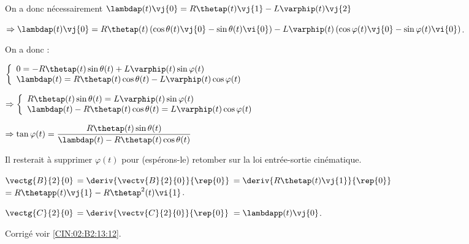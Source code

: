 On a donc nécessairement 
$\lambdap(t) \vj{0}= R\thetap(t) \vj{1} - L\varphip(t)\vj{2}$

$\Rightarrow \lambdap(t) \vj{0}= R\thetap(t) \left( \cos\theta(t)\vj{0}-\sin\theta(t)\vi{0} \right) - L\varphip(t)\left( \cos\varphi(t)\vj{0}-\sin\varphi(t)\vi{0}\right)$.

On a donc :

$
\left\{
\begin{array}{l}
0= -R\thetap(t) \sin\theta(t)  + L\varphip(t)\sin\varphi(t) \\
\lambdap(t) = R\thetap(t)  \cos\theta(t)- L\varphip(t)\cos\varphi(t)
\end{array}
\right.
$

$
\Rightarrow \left\{
\begin{array}{l}
R\thetap(t) \sin\theta(t)  = L\varphip(t)\sin\varphi(t) \\
\lambdap(t) - R\thetap(t)  \cos\theta(t)= L\varphip(t)\cos\varphi(t)
\end{array}
\right.
$

$\Rightarrow 
\tan \varphi(t) = \dfrac{R\thetap(t) \sin\theta(t) }{\lambdap(t) - R\thetap(t)  \cos\theta(t)}
$

Il resterait à supprimer $\varphi(t)$ pour (espérons-le) retomber sur la loi entrée-sortie cinématique.

\else
\fi


\ifprof
$\vectg{B}{2}{0}$
$=\deriv{\vectv{B}{2}{0}}{\rep{0}}$
$=\deriv{R\thetap(t) \vj{1}}{\rep{0}}$
$=R\thetapp(t) \vj{1} - R\thetap^2(t) \vi{1}$.
\else
\fi


\ifprof
$\vectg{C}{2}{0}$
$=\deriv{\vectv{C}{2}{0}}{\rep{0}}$
$=\lambdapp(t) \vj{0} $.
\else
\fi


\ifprof
\else
\begin{flushright}
\footnotesize{Corrigé  voir \ref{CIN:02:B2:13:12}.}
\end{flushright}%
\fi